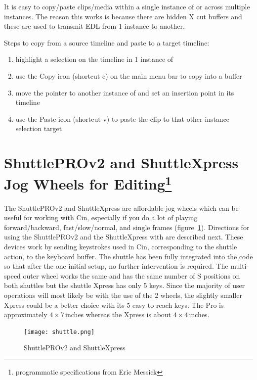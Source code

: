 It is easy to copy/paste clips/media within a single instance of
\CGG{} or across multiple instances.  The reason this works is
because there are hidden X cut buffers and these are used to
transmit EDL from 1 instance to another.

Steps to copy from a source timeline and paste to a target timeline:

\begin{enumerate}
\item highlight a selection on the timeline in 1 instance of \CGG{}
\item use the Copy icon (shortcut c) on the main menu bar to copy
  into a buffer
\item move the pointer to another instance of \CGG{} and set an
  insertion point in its timeline
\item use the Paste icon (shortcut v) to paste the clip to that
  other instance selection target
\end{enumerate}


\section[ShuttlePROv2 and ShuttleXpress Jog Wheels for Editing]{ShuttlePROv2 and ShuttleXpress Jog Wheels for Editing\protect\footnote{programmatic specifications from Eric Messick}}%
\label{sec:shuttle_jog_wheels_editing}

The ShuttlePROv2 and ShuttleXpress are affordable jog wheels which
can be useful for working with Cin, especially if you do a lot of
playing forward/backward, fast/slow/normal, and single frames
(figure~\ref{fig:shuttle}).
%
Directions for using the ShuttlePROv2 and the ShuttleXpress with
\CGG{} are described next. These devices work by sending keystrokes
used in Cin, corresponding to the shuttle action, to the keyboard
buffer. The shuttle has been fully integrated into the \CGG{} code
so that after the one initial setup, no further intervention is
required.  The multi-speed outer wheel works the same and has the
same number of S positions on both shuttles but the shuttle Xpress
has only 5 keys.  Since the majority of user operations will most
likely be with the use of the 2 wheels, the slightly smaller Xpress
could be a better choice with its 5 easy to reach keys.  The Pro is
approximately $4\times7$\,inches whereas the Xpress is about
$4\times4$\,inches.

\begin{figure}[htpb]
  \centering
  \texttt{[image: shuttle.png]}
  \caption{ShuttlePROv2 and ShuttleXpress}
  \label{fig:shuttle}
\end{figure}

